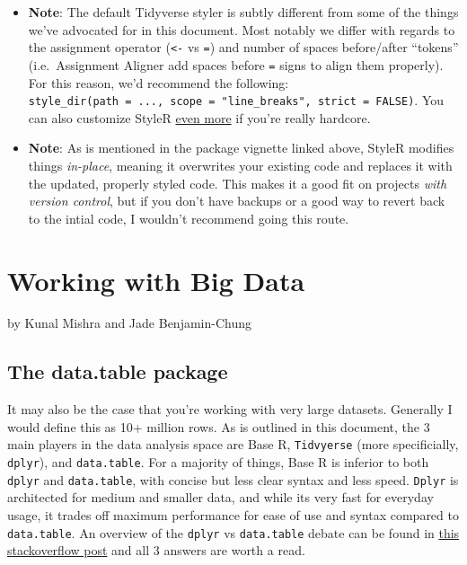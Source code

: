 \documentclass[]{book}
\providecommand{\tightlist}{%
  \setlength{\itemsep}{0pt}\setlength{\parskip}{0pt}}
\begin{document}
\begin{enumerate}
  \begin{itemize}
  \tightlist
  \item
    \textbf{Note}: The default Tidyverse styler is subtly different from
    some of the things we've advocated for in this document. Most
    notably we differ with regards to the assignment operator
    (\texttt{\textless{}-} vs \texttt{=}) and number of spaces
    before/after ``tokens'' (i.e.~Assignment Aligner add spaces before
    \texttt{=} signs to align them properly). For this reason, we'd
    recommend the following:
    \texttt{style\_dir(path\ =\ ...,\ scope\ =\ "line\_breaks",\ strict\ =\ FALSE)}.
    You can also customize StyleR
    \href{http://styler.r-lib.org/articles/customizing_styler.html}{even
    more} if you're really hardcore.
  \item
    \textbf{Note}: As is mentioned in the package vignette linked above,
    StyleR modifies things \emph{in-place}, meaning it overwrites your
    existing code and replaces it with the updated, properly styled
    code. This makes it a good fit on projects \emph{with version
    control}, but if you don't have backups or a good way to revert back
    to the intial code, I wouldn't recommend going this route.
  \end{itemize}
\end{enumerate}

\chapter{Working with Big Data}\label{working-with-big-data}

by Kunal Mishra and Jade Benjamin-Chung

\section{The data.table package}\label{the-data.table-package}

It may also be the case that you're working with very large datasets.
Generally I would define this as 10+ million rows. As is outlined in
this document, the 3 main players in the data analysis space are Base R,
\texttt{Tidvyerse} (more specificially, \texttt{dplyr}), and
\texttt{data.table}. For a majority of things, Base R is inferior to
both \texttt{dplyr} and \texttt{data.table}, with concise but less clear
syntax and less speed. \texttt{Dplyr} is architected for medium and
smaller data, and while its very fast for everyday usage, it trades off
maximum performance for ease of use and syntax compared to
\texttt{data.table}. An overview of the \texttt{dplyr} vs
\texttt{data.table} debate can be found in
\href{https://stackoverflow.com/questions/21435339/data-table-vs-dplyr-can-one-do-something-well-the-other-cant-or-does-poorly/27840349\#27840349}{this
stackoverflow post} and all 3 answers are worth a read.
\end{document}
